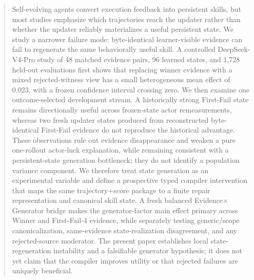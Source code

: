 \begin{abstract}
Self-evolving agents convert execution feedback into persistent skills, but most studies emphasize which trajectories reach the updater rather than whether the updater reliably materializes a useful persistent state. We study a narrower failure mode: byte-identical learner-visible evidence can fail to regenerate the same behaviorally useful skill. A controlled DeepSeek-V4-Pro study of 48 matched evidence pairs, 96 learned states, and 1,728 held-out evaluations first shows that replacing winner evidence with a mixed rejected-witness view has a small heterogeneous mean effect of 0.023, with a frozen confidence interval crossing zero. We then examine one outcome-selected development stream. A historically strong First-Fail state remains directionally useful across frozen-state actor remeasurements, whereas two fresh updater states produced from reconstructed byte-identical First-Fail evidence do not reproduce the historical advantage. These observations rule out evidence disappearance and weaken a pure one-rollout actor-luck explanation, while remaining consistent with a persistent-state generation bottleneck; they do not identify a population variance component. We therefore treat state generation as an experimental variable and define a prospective typed compiler intervention that maps the same trajectory+score package to a finite repair representation and canonical skill state. A fresh balanced Evidence$\times$Generator bridge makes the generator-factor main effect primary across Winner and First-Fail-4 evidence, while separately testing generic/scope canonicalization, same-evidence state-realization disagreement, and any rejected-source moderator. The present paper establishes local state-regeneration instability and a falsifiable generator hypothesis; it does not yet claim that the compiler improves utility or that rejected failures are uniquely beneficial.
\end{abstract}
